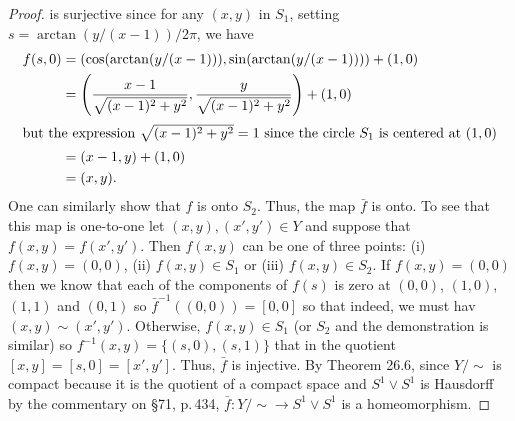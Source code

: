 \begin{proof}
is surjective since for any $(x,y)$ in $S_1$, setting
$s=\arctan(y/(x-1))/2\pi$, we have
\begin{align*}
f(s,0)
&=(\cos(\arctan(y/(x-1))),\sin(\arctan(y/(x-1))))+(1,0)\\
&=\left(\frac{x-1}{\sqrt{(x-1)^2+y^2}},\frac{y}{\sqrt{(x-1)^2+y^2}}
  \right)+(1,0)\\
\intertext{but the expression $\sqrt{(x-1)^2+y^2}=1$ since the circle $S_1$
  is centered at $(1,0)$}
&=(x-1,y)+(1,0)\\
&=(x,y).
\end{align*}
One can similarly show that $f$ is onto $S_2$. Thus, the map $\bar f$ is
onto. To see that this map is one-to-one let $(x,y),(x',y')\in Y$ and
suppose that $f(x,y)=f(x',y')$. Then $f(x,y)$ can be one of three points:
(i) $f(x,y)=(0,0)$, (ii) $f(x,y)\in S_1$ or (iii) $f(x,y)\in S_2$. If
$f(x,y)=(0,0)$ then we know that each of the components of $f(s)$ is zero at
$(0,0)$, $(1,0)$, $(1,1)$ and $(0,1)$ so $\bar f^{-1}((0,0))=[0,0]$ so that
indeed, we must hav $(x,y)\sim(x',y')$. Otherwise, $f(x,y)\in S_1$ (or
$S_2$ and the demonstration is similar) so $f^{-1}(x,y)=\{(s,0),(s,1)\}$
that in the quotient $[x,y]=[s,0]=[x',y']$. Thus, $\bar f$ is injective. By
Theorem 26.6, since $Y/{\sim}$ is compact because it is the quotient of a
compact space and $S^1\vee S^1$ is Hausdorff by the commentary on \S71,
p.\,434, $\bar f\colon Y/{\sim}\to S^1\vee S^1$ is a homeomorphism.
\end{proof}

